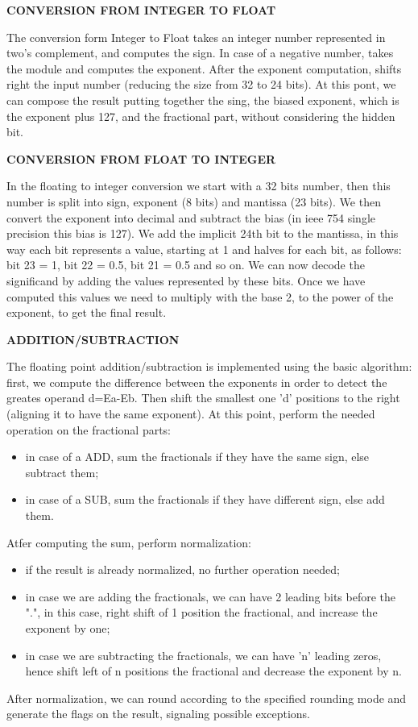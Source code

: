 \textbf{CONVERSION FROM INTEGER TO FLOAT}
\newline

The conversion form Integer to Float takes an integer number represented in two's complement, and computes the sign. In case of a negative number, takes the module and computes the exponent. After the exponent computation, shifts right the input number (reducing the size from 32 to 24 bits). At this pont, we can compose the result putting together the sing, the biased exponent, which is the exponent plus 127, and the fractional part, without considering the hidden bit.
\newline

\textbf{CONVERSION FROM FLOAT TO INTEGER}
\newline

In the floating to integer conversion we start with a 32 bits number, then this number is split into sign, exponent (8 bits) and mantissa (23 bits). We then convert the exponent into decimal and subtract the bias (in ieee 754 single precision this bias is 127).
We add the implicit 24th bit to the mantissa, in this way each bit represents a value, starting at 1 and halves for each bit, as follows: bit 23 = 1, bit 22 = 0.5, bit 21 = 0.5 and so on. We can now decode the significand by adding the values represented by these bits. Once we have computed this values we need to multiply with the base 2, to the power of the exponent, to get the final result.
\newline

\textbf{ADDITION/SUBTRACTION}
\newline

The floating point addition/subtraction is implemented using the basic algorithm: first, we compute the difference between the exponents in order to detect the greates operand d=Ea-Eb. Then shift the smallest one 'd' positions to the right (aligning it to have the same exponent). At this point, perform the needed operation on the fractional parts:
\begin{itemize}
\item in case of a ADD, sum the fractionals if they have the same sign, else subtract them;
\item in case of a SUB, sum the fractionals if they have different sign, else add them.
\end{itemize}
Atfer computing the sum, perform normalization:
\begin{itemize}
\item if the result is already normalized, no further operation needed;
\item in case we are adding the fractionals, we can have 2 leading bits before the ".", in this case, right shift of 1 position the fractional, and increase the exponent by one;
\item in case we are subtracting the fractionals, we can have 'n' leading zeros, hence shift left of n positions the fractional and decrease the exponent by n.
\end{itemize}
After normalization, we can round according to the specified rounding mode and generate the flags on the result, signaling possible exceptions.
\newline

